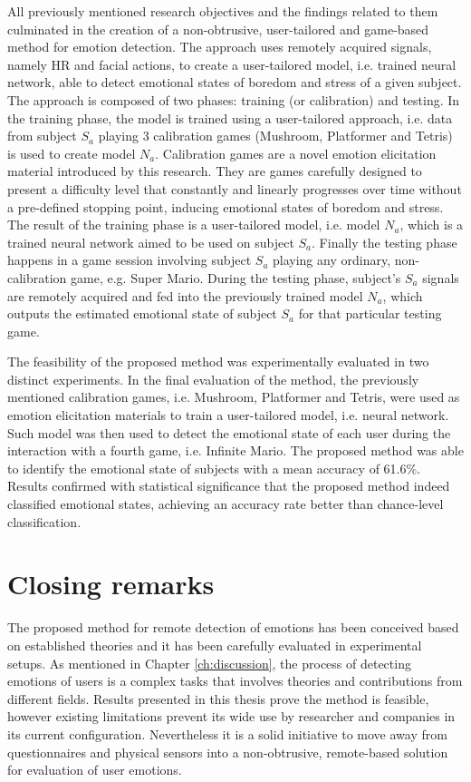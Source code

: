 All previously mentioned research objectives and the findings related to them culminated in the creation of a non-obtrusive, user-tailored and game-based method for emotion detection. The approach uses remotely acquired signals, namely HR and facial actions, to create a user-tailored model, i.e. trained neural network, able to detect emotional states of boredom and stress of a given subject. The approach is composed of two phases: training (or calibration) and testing. In the training phase, the model is trained using a user-tailored approach, i.e. data from subject $S_a$ playing 3 calibration games (Mushroom, Platformer and Tetris) is used to create model $N_a$. Calibration games are a novel emotion elicitation material introduced by this research. They are games carefully designed to present a difficulty level that constantly and linearly progresses over time without a pre-defined stopping point, inducing emotional states of boredom and stress. The result of the training phase is a user-tailored model, i.e. model $N_a$, which is a trained neural network aimed to be used on subject $S_a$. Finally the testing phase happens in a game session involving subject $S_a$ playing any ordinary, non-calibration game, e.g. Super Mario. During the testing phase, subject's $S_a$ signals are remotely acquired and fed into the previously trained model $N_a$, which outputs the estimated emotional state of subject $S_a$ for that particular testing game.

The feasibility of the proposed method was experimentally evaluated in two distinct experiments. In the final evaluation of the method, the previously mentioned calibration games, i.e. Mushroom, Platformer and Tetris, were used as emotion elicitation materials to train a user-tailored model, i.e. neural network. Such model was then used to detect the emotional state of each user during the interaction with a fourth game, i.e. Infinite Mario. The proposed method was able to identify the emotional state of subjects with a mean accuracy of 61.6\%. Results confirmed with statistical significance that the proposed method indeed classified emotional states, achieving an accuracy rate better than chance-level classification.

\section{Closing remarks}

The proposed method for remote detection of emotions has been conceived based on established theories and it has been carefully evaluated in experimental setups. As mentioned in Chapter \ref{ch:discussion}, the process of detecting emotions of users is a complex tasks that involves theories and contributions from different fields. Results presented in this thesis prove the method is feasible, however existing limitations prevent its wide use by researcher and companies in its current configuration. Nevertheless it is a solid initiative to move away from questionnaires and physical sensors into a non-obtrusive, remote-based solution for evaluation of user emotions.

